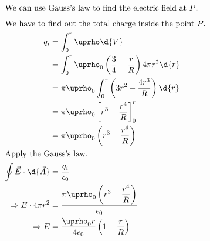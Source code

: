 \begin{align*}
			\intertext{We can use Gauss's law to find the electric field at $P$.}
			\intertext{We have to find out the total charge inside the point $P$.}
			q_i &= \int_{0}^{r} \uprho \d{V}\\
			 	&= \int_0^r \uprho_0 \left(\dfrac{3}{4}-\dfrac{r}{R}\right)4\pi r^2 \d{r}\\
				&= \pi\uprho_0\int_{0}^{r} \left(3r^2 - \dfrac{4r^3}{R} \right) \d{r}\\
				&= \pi\uprho_0\left[r^3 - \dfrac{r^4}{R}\right]_0^r\\
				&= \pi\uprho_0\left(r^3 - \dfrac{r^4}{R}\right)\\
			\intertext{Apply the Gauss's law.}
			\oint \vec{E}\cdot\d{\vec{A}} &= \dfrac{q_i}{\epsilon_0}\\
			\Rightarrow E\cdot 4\pi r^2 &= \dfrac{\pi\uprho_0\left(r^3 - \dfrac{r^4}{R}\right)}{\epsilon_0}\\
			\Rightarrow E &= \dfrac{\uprho_0 r}{4\epsilon_0}\left(1-\dfrac{r}{R}\right)
		\end{align*}